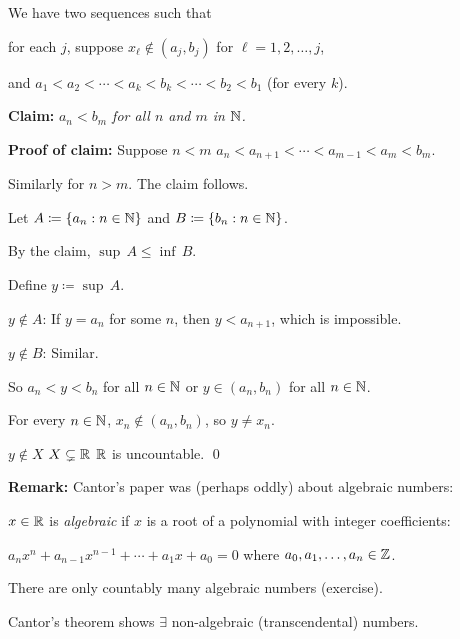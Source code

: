 \documentclass[10pt,aspectratio=149]{beamer}
\begin{document}
\begin{frame}
We have two sequences such that

for each $j$, suppose $x_\ell \notin (a_{j},b_{j})$ for $\ell=1,2,\ldots,j$,

and 
$a_1 < a_2 < \cdots < a_{k} < b_{k} < \cdots < b_2 < b_1$ (for every $k$).

\medskip
\pause

\textbf{Claim:} \emph{$a_n < b_m$ for all $n$ and $m$ in ${\mathbb{N}}$.}

\pause
\textbf{Proof of claim:}
Suppose $n < m$ \pause \wthus
$a_n < a_{n+1} < \cdots < a_{m-1} < a_m < b_m$.

\pause
Similarly for $n > m$.  The claim follows.

\medskip
\pause

Let $A \coloneqq \{ a_n : n \in {\mathbb{N}} \}$ and $B \coloneqq \{ b_n : n \in {\mathbb{N}} \}$.

\pause
By the claim, \quad $\sup\, A \leq \inf\, B$.

\pause
Define $y \coloneqq \sup\, A$.

\pause
$y \notin A$: If $y=a_n$ for some $n$, then $y < a_{n+1}$, which is impossible.

\pause
$y \notin B$: Similar.

\pause
So $a_n < y < b_n$ for all $n \in {\mathbb{N}}$ \quad or \quad $y \in (a_n,b_n)$ for
all $n \in {\mathbb{N}}$.

\pause
For every $n \in {\mathbb{N}}$, $x_n \not\in (a_n,b_n)$, so $y \not= x_n$.

\pause
\thus \quad $y \notin X$ \pause \wthus $X \subsetneq {\mathbb{R}}$ \pause \wthus ${\mathbb{R}}$
is uncountable.
\qed
\end{frame}

\begin{frame}
\textbf{Remark:}
Cantor's paper was (perhaps oddly) about algebraic numbers:

\medskip
\pause

$x \in {\mathbb{R}}$ is \emph{algebraic} if $x$ is a root of a polynomial with
integer coefficients:

$a_n x^n + a_{n-1} x^{n-1}  + \cdots
+ a_1 x + a_0 = 0$ \quad where $a_0,a_1,\ldots,a_n \in {\mathbb{Z}}$.

\medskip
\pause

There are only countably many algebraic numbers (exercise).

\medskip
\pause

Cantor's theorem shows $\exists$ non-algebraic (transcendental)
numbers.

\end{frame}
\end{document}
